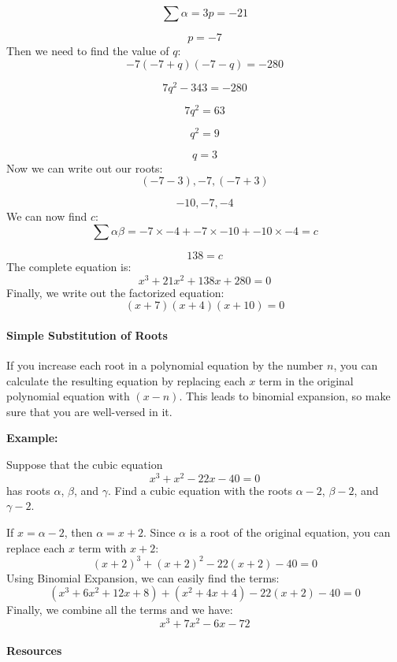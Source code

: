 $$
\sum \alpha = 3p = -21
$$



$$
p = -7
$$
Then we need to find the value of $q$:
$$
-7(-7 + q)(-7 - q) = -280
$$



$$
7q^2 - 343 = -280
$$



$$
7q^2 = 63
$$



$$
q^2 = 9
$$



$$
q = 3
$$
Now we can write out our roots:
$$
(-7 - 3), -7, (-7 + 3)
$$



$$
-10, -7, -4
$$
We can now find $c$:
$$
\sum \alpha \beta = -7 \times -4 + -7 \times -10 + -10 \times -4 = c
$$



$$
138 = c
$$
The complete equation is:
$$
x^3 + 21x^2 + 138x + 280 = 0
$$
Finally, we write out the factorized equation:
$$
(x + 7)(x + 4)(x + 10) = 0
$$
\paragraph{Simple Substitution of Roots}



If you increase each root in a polynomial equation by the number $n$, you can calculate the resulting equation by replacing each $x$ term in the original polynomial equation with $(x - n)$. This leads to binomial expansion, so make sure that you are well-versed in it.



\textbf{Example:}



Suppose that the cubic equation 
$$
x^3 + x^2 - 22x - 40 = 0
$$ 
has roots $\alpha$, $\beta$, and $\gamma$. Find a cubic equation with the roots $\alpha - 2$, $\beta - 2$, and $\gamma - 2$.



If $x = \alpha - 2$, then $\alpha = x + 2$. Since $\alpha$ is a root of the original equation, you can replace each $x$ term with $x + 2$:
$$
(x + 2)^3 + (x + 2)^2 - 22(x + 2) - 40 = 0
$$
Using Binomial Expansion, we can easily find the terms:
$$
(x^3 + 6x^2 + 12x + 8) + (x^2 + 4x + 4) - 22(x + 2) - 40 = 0
$$
Finally, we combine all the terms and we have:
$$
x^3 + 7x^2 - 6x - 72
$$
\paragraph{Resources}



